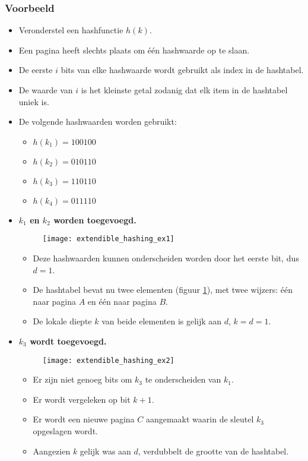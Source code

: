 \subsubsection{Voorbeeld}
\begin{itemize}
    \item Veronderstel een hashfunctie $h(k)$.
    \item Een pagina heeft slechts plaats om één hashwaarde op te slaan.
    \item De eerste $i$ bits van elke hashwaarde wordt gebruikt als index in de hashtabel. 
    \item De waarde van $i$ is het kleinste getal zodanig dat elk item in de hashtabel uniek is.
    \item De volgende hashwaarden worden gebruikt:
    \begin{itemize}
        \item $h(k_1) = 100100$
        \item $h(k_2) = 010110$
        \item $h(k_3) = 110110$
        \item $h(k_4) = 011110$
    \end{itemize}
    \item \textbf{$k_1$ en $k_2$ worden toegevoegd.}
    \begin{figure}[ht]
        \centering
        \texttt{[image: extendible\_hashing\_ex1]}
        \caption{}
        \label{fig:extendible_hashing_ex1}
    \end{figure}
    \begin{itemize}
        \item Deze hashwaarden kunnen onderscheiden worden door het eerste bit, dus $d = 1$.
        \item De hashtabel bevat nu twee elementen (figuur \ref{fig:extendible_hashing_ex1}), met twee wijzers: één naar pagina $A$ en één naar pagina $B$. 
        \item De lokale diepte $k$ van beide elementen is gelijk aan $d$, $k = d = 1$.
    \end{itemize}
    \item \textbf{$k_3$ wordt toegevoegd.}
    \begin{figure}[ht]
        \centering
        \texttt{[image: extendible\_hashing\_ex2]}
        \caption{}
        \label{fig:extendible_hashing_ex2}
    \end{figure}
    \begin{itemize}
        \item Er zijn niet genoeg bits om $k_3$ te onderscheiden van $k_1$.
        \item Er wordt vergeleken op bit $k + 1$.
        \item Er wordt een nieuwe pagina $C$ aangemaakt waarin de sleutel $k_3$ opgeslagen wordt.
        \item Aangezien $k$ gelijk was aan $d$, verdubbelt de grootte van de hashtabel.              
    \end{itemize}
\end{itemize}

